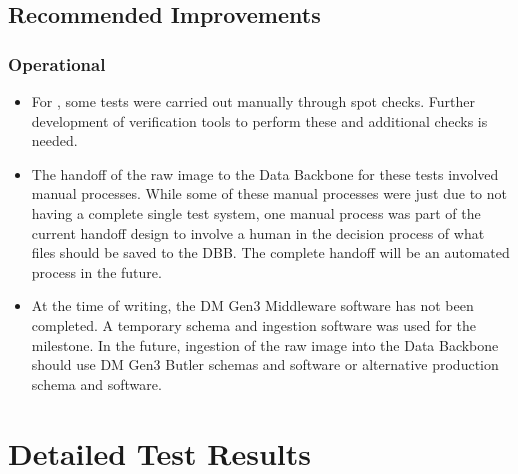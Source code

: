 \documentclass[DM,lsstdraft,STR,toc]{lsstdoc}
\begin{document}
\subsection{Recommended Improvements}
\label{sect:recommendations}

\subsubsection{Operational}

\begin{itemize}
  \item{For \milestoneId{}, some tests were carried out manually through spot checks.
    Further development of verification tools to perform these and additional checks is needed.  }
  \item{The handoff of the raw image to the Data Backbone for these tests involved manual processes.  While some of these manual processes 
 were just due to not having a complete single test system, one manual process was part of the current handoff design to involve a human in the
decision process of what files should be saved to the DBB.   The complete handoff will be an automated process in the future.}
  \item{At the time of writing, the DM Gen3 Middleware software has not been
        completed.   A temporary schema and ingestion software was used for the milestone.  
        In the future, ingestion of the raw image into the Data Backbone should use DM Gen3 
        Butler schemas and software or alternative production schema and software.}
\end{itemize}


\newpage

\section{Detailed Test Results}
\label{sect:detailed}
\end{document}
